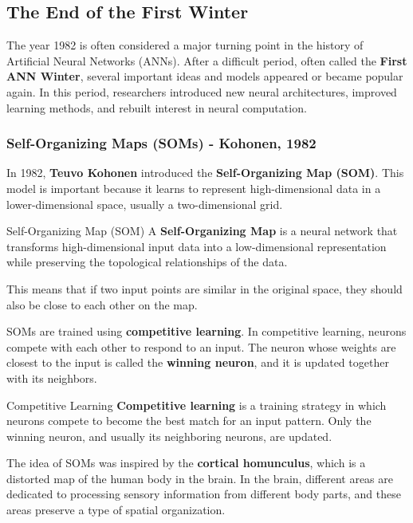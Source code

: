 \documentclass[11pt]{article}
\theoremstyle{smallexample}
\begin{document}
\subsection{The End of the First Winter}
The year 1982 is often considered a major turning point in the history of Artificial Neural Networks (ANNs). After a difficult period, often called the \textbf{First ANN Winter}, several important ideas and models appeared or became popular again. In this period, researchers introduced new neural architectures, improved learning methods, and rebuilt interest in neural computation.


\subsubsection{Self-Organizing Maps (SOMs) - Kohonen, 1982}

In 1982, \textbf{Teuvo Kohonen} introduced the \textbf{Self-Organizing Map (SOM)}. This model is important because it learns to represent high-dimensional data in a lower-dimensional space, usually a two-dimensional grid.

\begin{defbox}{Self-Organizing Map (SOM)}
A \textbf{Self-Organizing Map} is a neural network that transforms high-dimensional input data into a low-dimensional representation while preserving the topological relationships of the data.
\end{defbox}

This means that if two input points are similar in the original space, they should also be close to each other on the map.

SOMs are trained using \textbf{competitive learning}. In competitive learning, neurons compete with each other to respond to an input. The neuron whose weights are closest to the input is called the \textbf{winning neuron}, and it is updated together with its neighbors.

\begin{defbox}{Competitive Learning}
\textbf{Competitive learning} is a training strategy in which neurons compete to become the best match for an input pattern. Only the winning neuron, and usually its neighboring neurons, are updated.
\end{defbox}

The idea of SOMs was inspired by the \textbf{cortical homunculus}, which is a distorted map of the human body in the brain. In the brain, different areas are dedicated to processing sensory information from different body parts, and these areas preserve a type of spatial organization.
\end{document}
